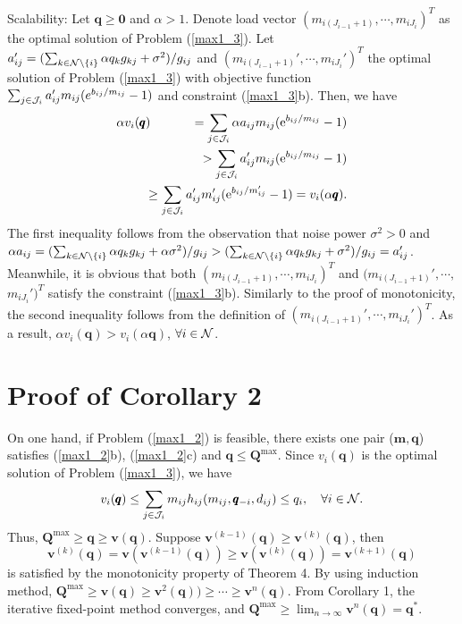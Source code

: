 \documentclass[journal]{IEEEtran}
\begin{document}
Scalability:
Let $\pmb{q} \geq \pmb{0}$ and $\alpha >1$.
Denote load vector $(m_{i (J_{i-1}+1)}, \cdots, m_{i J_{i}})^T$ as
the optimal solution of Problem (\ref{max1_3}).
Let
$a_{ij}'=({\sum_{k \in {\cal{N}}\setminus \{i\}}  \alpha q_k g_{kj} +\sigma ^2}
)/{g_{ij}}$ and $(m_{i (J_{i-1}+1)}', \cdots, m_{i J_{i}}')^T$ the optimal solution
of Problem (\ref{max1_3}) with objective function $\sum_{j \in {\cal{J}}_i }
a_{ij}' m_{ij}( e^{b_{ij}/ m_{ij} }-1 )$ and constraint (\ref{max1_3}b).
Then, we have
\begin{eqnarray}\label{eqnarray13}
\alpha v_i(\pmb{q})
&&\!\!\!\!\!\!\!=\sum_{j \in {\cal{J}}_i }
\alpha a_{ij} m_{ij}
( \text e^{b_{ij}/ m_{ij} }-1 )
\nonumber \\
&&\!\!\!\!\!\!\!>
\sum_{j \in {\cal{J}}_i }
a_{ij}' m_{ij}
(\text  e^{b_{ij}/ m_{ij} }-1 )\nonumber \\
&&\!\!\!\!\!\!\!\geq
\sum_{j \in {\cal{J}}_i }
a_{ij}' m_{ij}'
( \text e^{b_{ij}/ m_{ij}' }-1 )=v_i(\alpha \pmb{q}).
\end{eqnarray}
The first inequality follows from the observation that noise power $\sigma ^2>0$ and $\alpha a_{ij}= ({\sum_{k \in {\cal{N}}\setminus \{i\}}  \alpha q_k g_{kj} +\alpha \sigma ^2}
)/{g_{ij}} > ({\sum_{k \in {\cal{N}}\setminus \{i\}}  \alpha q_k g_{kj} + \sigma ^2}
)/{g_{ij}} = a_{ij}'$.
Meanwhile,
it is obvious that both
$(m_{i (J_{i-1}+1)}, \cdots, m_{i J_{i}})^T$
and
$(m_{i (J_{i-1}+1)}', \cdots,$ $ m_{i J_{i}}')^T$ satisfy the constraint (\ref{max1_3}b).
Similarly to the proof of monotonicity, the second inequality follows
from the definition of $(m_{i (J_{i-1}+1)}', \cdots, m_{i J_{i}}')^T$.
As a result,
$\alpha{v}_i(\pmb{q}) > {v}_i(\alpha \pmb{q})$,
$\forall i \in {\cal{N}}$.

\section{Proof of Corollary 2}
On one hand, if Problem (\ref{max1_2}) is feasible, there exists one pair ($\pmb m, \pmb q$) satisfies (\ref{max1_2}b), (\ref{max1_2}c) and $\pmb q \leq \pmb Q^{\max}$.
Since $v_{i}(\pmb q)$ is the optimal solution of Problem (\ref{max1_3}), we have
\begin{equation}
v_{i} (\pmb q)\leq \sum_{j \in {\cal{J}}_i } m_{ij} h_{ij}(m_{ij},\pmb{q}_{-i}, d_{ij})\leq q_i, \quad\forall i  \in {\cal{N}}.
\end{equation}
Thus, $\pmb Q^{\max}\geq \pmb q \geq \pmb v(\pmb q)$.
Suppose $\pmb v^{(k-1)}(\pmb q)\geq\pmb v^{(k)}(\pmb q)$, then
\begin{equation}
\pmb v^{(k)}(\pmb q)=\pmb v(\pmb v^{(k-1)}(\pmb q)) \geq \pmb v(\pmb v^{(k)}(\pmb q))=\pmb v^{(k+1)}(\pmb q)
\end{equation}
is satisfied by the monotonicity property of Theorem 4.
By using induction method, $\pmb Q^{\max}\geq \pmb v(\pmb q)\geq \pmb v^2(\pmb q))\geq\cdots\geq \pmb v^n(\pmb q)$.
From Corollary 1, the iterative fixed-point method converges, and
$\pmb Q^{\max}\geq \lim_{n\rightarrow\infty}\pmb v^n(\pmb q)=\pmb q^*$.
\end{document}

